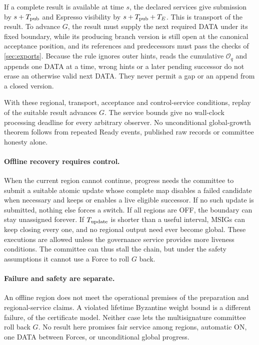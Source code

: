 \documentclass[11pt,a4paper]{article}
\begin{document}
If a complete result is available at time $s$, the declared services give
submission by $s+T_{\rm pub}$ and Espresso visibility by
$s+T_{\rm pub}+T_E$. This is transport of the result. To advance $G$, the
result must supply the next required DATA under its fixed boundary, while
its producing branch version is still open at the canonical acceptance
position, and its references and predecessors must pass the checks of
\cref{sec:exports}. Because the rule ignores outer hints, reads the
cumulative $\mathcal O_q$ and appends one DATA at a time, wrong hints or
a later pending successor do not erase an otherwise valid next DATA. They never permit a gap or an append from a
closed version.

With these regional, transport, acceptance and control-service
conditions, replay of the suitable result advances $G$. The service
bounds give no wall-clock processing deadline for every arbitrary
observer. No unconditional global-growth theorem follows from repeated
Ready events, published raw records or committee honesty alone.

\paragraph{Offline recovery requires control.}
When the current region cannot continue, progress needs the committee to
submit a suitable atomic update whose complete map disables a failed
candidate when necessary and keeps or enables a live eligible successor.
If no such update is
submitted, nothing else forces a switch. If all regions are OFF, the
boundary can stay unassigned forever. If $T_{\rm update}$ is shorter than
a useful interval, MSIGs can keep closing every one, and no regional
output need ever become global. These executions
are allowed unless the governance service provides more liveness
conditions. The committee can thus stall the chain, but under the
safety assumptions it cannot use a Force to roll $G$ back.

\paragraph{Failure and safety are separate.}
An offline region does not meet the operational premises of the
preparation and regional-service claims. A violated lifetime Byzantine
weight bound is a different failure, of the certificate model. Neither
case lets the multisignature committee roll back $G$. No result here
promises fair service among regions, automatic ON, one DATA between
Forces, or unconditional global progress.
\end{document}
